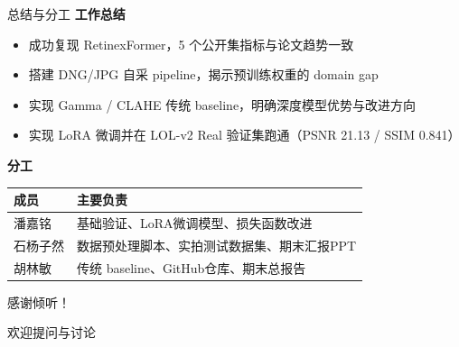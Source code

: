 \documentclass[aspectratio=169,10pt]{beamer}
\begin{document}
\begin{frame}{总结与分工}
  \small
  \textbf{工作总结}
  \begin{itemize}
    \item 成功复现 RetinexFormer，5 个公开集指标与论文趋势一致
    \item 搭建 DNG/JPG 自采 pipeline，揭示预训练权重的 domain gap
    \item 实现 Gamma / CLAHE 传统 baseline，明确深度模型优势与改进方向
    \item 实现 LoRA 微调并在 LOL-v2 Real 验证集跑通（PSNR 21.13 / SSIM 0.841）
  \end{itemize}

  \vspace{0.5em}
  \textbf{分工}
  \begin{tabular}{ll}
    \toprule
    成员 & 主要负责 \\
    \midrule
    潘嘉铭 & 基础验证、LoRA微调模型、损失函数改进 \\
    石杨子然 & 数据预处理脚本、实拍测试数据集、期末汇报PPT \\
    胡林敏 & 传统 baseline、GitHub仓库、期末总报告 \\
    \bottomrule
  \end{tabular}
\end{frame}

\begin{frame}[plain,c]
  \centering
  \vspace{2em}
  {\LARGE 感谢倾听！}

  \vspace{1.5em}
  \large 欢迎提问与讨论
\end{frame}
\end{document}
